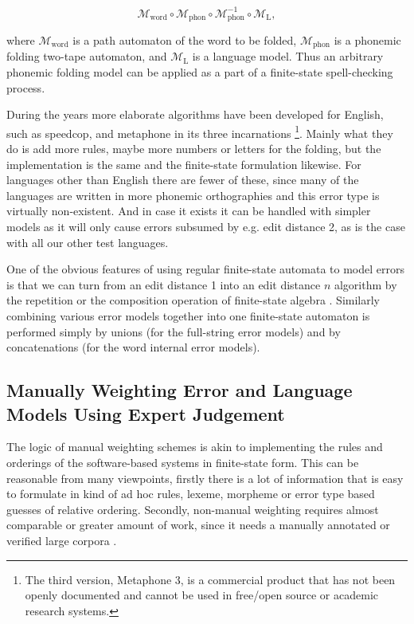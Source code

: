 \documentclass[a4paper,12pt]{article}
\begin{document}
\begin{equation}
    \mathcal{M}_{\mathrm{word}} \circ \mathcal{M}_{\mathrm{phon}} \circ \mathcal{M}_{\mathrm{phon}}^{-1} \circ \mathcal{M}_{\mathrm{L}},
\end{equation}

where $\mathcal{M}_{\mathrm{word}}$ is a path automaton of the word to be
folded, $\mathcal{M}_{\mathrm{phon}}$ is a phonemic folding two-tape automaton,
and $\mathcal{M}_{\mathrm{L}}$ is a language model. Thus an arbitrary phonemic
folding model can be applied as a part of a finite-state spell-checking
process.

During the years more elaborate algorithms have been developed for English,
such as speedcop, and metaphone in its three incarnations
\cite[]{philips1990hanging,philips2000double}\footnote{The third version,
    Metaphone 3, is a commercial product that has not been openly documented
and cannot be used in free/open source or academic research systems.}.  Mainly
what they do is add more rules, maybe more numbers or letters for the folding,
but the implementation is the same and the finite-state formulation likewise.
For languages other than English there are fewer of these, since many of the
languages are written in more phonemic orthographies and this error type is
virtually non-existent. And in case it exists it can be handled with simpler
models as it will only cause errors subsumed by e.g. edit distance 2, as is the
case with all our other test languages.

One of the obvious features of using regular finite-state automata to model
errors is that we can turn from an edit distance 1 into an edit distance $n$
algorithm by the repetition or the composition operation of finite-state
algebra \cite[]{pirinen2012effects}.  Similarly combining various error models
together into one finite-state automaton is performed simply by unions (for the
full-string error models) and by concatenations (for the word internal error
models).

\subsection{Manually Weighting Error and Language Models Using Expert
Judgement}
\label{subsec:manual-weighting}

The logic of manual weighting schemes is akin to implementing the rules and
orderings of the software-based systems in finite-state form. This can be
reasonable from many viewpoints, firstly there is a lot of information that
is easy to formulate in kind of ad hoc rules, lexeme, morpheme or error
type based guesses of relative ordering. Secondly, non-manual weighting
requires almost comparable or greater amount of work, since it needs a
manually annotated or verified large corpora .
\end{document}
